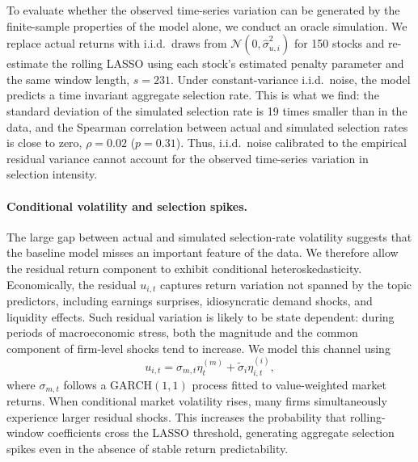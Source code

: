 To evaluate whether the observed time-series variation can be generated by the finite-sample properties of the model alone, we conduct an oracle simulation. We replace actual returns with i.i.d.\ draws from $\mathcal{N}(0,\hat\sigma_{u,i}^2)$ for 150 stocks and re-estimate the rolling LASSO using each stock's estimated penalty parameter and the same window length, $s=231$. Under constant-variance i.i.d.\ noise, the model predicts a time invariant aggregate selection rate. This is what we find: the standard deviation of the simulated selection rate is 19 times smaller than in the data, and the Spearman correlation between actual and simulated selection rates is close to zero, $\rho=0.02$ ($p=0.31$). Thus, i.i.d.\ noise calibrated to the empirical residual variance cannot account for the observed time-series variation in selection intensity.


\paragraph{Conditional volatility and selection spikes.}

The large gap between actual and simulated selection-rate volatility suggests that the baseline model misses an important feature of the data. We therefore allow the residual return component to exhibit conditional heteroskedasticity. Economically, the residual $u_{i,t}$ captures return variation not spanned by the topic predictors, including earnings surprises, idiosyncratic demand shocks, and liquidity effects. Such residual variation is likely to be state dependent: during periods of macroeconomic stress, both the magnitude and the common component of firm-level shocks tend to increase.
We model this channel using
\[
u_{i,t} = \sigma_{m,t}\eta_t^{(m)} + \tilde\sigma_i\eta_{i,t}^{(i)},
\]
where $\sigma_{m,t}$ follows a GARCH$(1,1)$ process fitted to value-weighted market returns. When conditional market volatility rises, many firms simultaneously experience larger residual shocks. This increases the probability that rolling-window coefficients cross the LASSO threshold, generating aggregate selection spikes even in the absence of stable return predictability.

